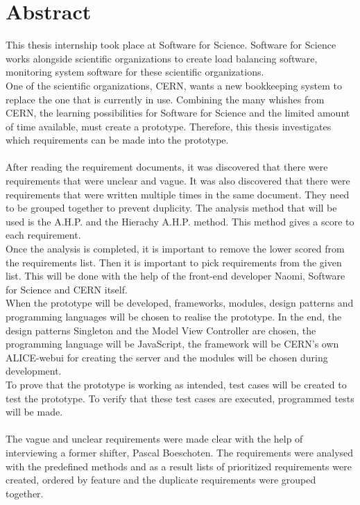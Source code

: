 \documentclass[paper=a4, fontsize=11pt,twoside]{scrartcl}	%
\begin{document}
\section*{Abstract}
This thesis internship took place at Software for Science. Software for Science works alongside scientific organizations to create load balancing software, monitoring system software for these scientific organizations. \\ One of the scientific organizations, CERN, wants a new bookkeeping system to replace the one that is currently in use. Combining the many whishes from CERN, the learning possibilities for Software for Science and the limited amount of time available, must create a prototype. Therefore, this thesis investigates which requirements can be made into the prototype. \\ \\
After reading the requirement documents, it was discovered that there were requirements that were unclear and vague. It was also discovered that there were requirements that were written multiple times in the same document. They need to be grouped together to prevent duplicity. The analysis method that will be used is the A.H.P. and the Hierachy A.H.P. method. This method gives a score to each requirement. \\
Once the analysis is completed, it is important to remove the lower scored  from the requirements list. Then it is important to pick requirements from the given list. This will be done with the help of the front-end developer Naomi, Software for Science and CERN itself. \\
When the prototype will be developed, frameworks, modules, design patterns and programming languages will be chosen to realise the prototype. In the end, the design patterns Singleton and the Model View Controller are chosen, the programming language will be JavaScript, the framework will be CERN's own ALICE-webui for creating the server and the modules will be chosen during development. \\
To prove that the prototype is working as intended, test cases will be created to test the prototype. To verify that these test cases are executed, programmed tests will be made. \\ \\
The vague and unclear requirements were made clear with the help of interviewing a former shifter, Pascal Boeschoten. The requirements were analysed with the predefined methods and as a result lists of prioritized requirements were created, ordered by feature and the duplicate requirements were grouped together. \\
\end{document}
